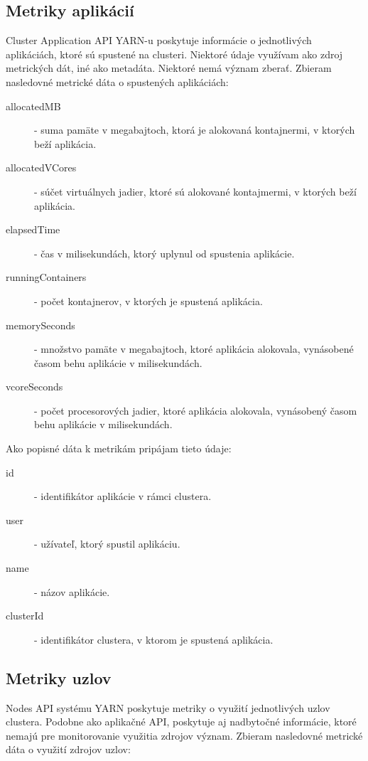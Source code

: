 \documentclass[12pt,twoside,color,cover,table]{fithesis3}
\begin{document}
\subsection{Metriky aplikácií}
Cluster Application API YARN-u poskytuje informácie o jednotlivých aplikáciách, ktoré sú spustené na clusteri. Niektoré údaje využívam ako zdroj metrických dát, iné ako metadáta. Niektoré nemá význam zberať.
Zbieram nasledovné metrické dáta o spustených aplikáciách:
\begin{description}
\item[allocatedMB] - suma pamäte v megabajtoch, ktorá je alokovaná kontajnermi, v ktorých beží aplikácia.
\item[allocatedVCores] - súčet virtuálnych jadier, ktoré sú alokované kontajmermi, v ktorých beží aplikácia.
\item[elapsedTime] - čas v milisekundách, ktorý uplynul od spustenia aplikácie.
\item[runningContainers] - počet kontajnerov, v ktorých je spustená aplikácia.
\item[memorySeconds] - množstvo pamäte v megabajtoch, ktoré aplikácia alokovala, vynásobené časom behu aplikácie v milisekundách.
\item[vcoreSeconds] - počet procesorových jadier, ktoré aplikácia alokovala, vynásobený časom behu aplikácie v milisekundách.
\end{description}

Ako popisné dáta k metrikám pripájam tieto údaje:
\begin{description}
\item[id] - identifikátor aplikácie v rámci clustera.
\item[user] - užívateľ, ktorý spustil aplikáciu.
\item[name] - názov aplikácie.
\item[clusterId] - identifikátor clustera, v ktorom je spustená aplikácia.
\end{description}

\subsection{Metriky uzlov}
Nodes API systému YARN poskytuje metriky o využití jednotlivých uzlov clustera. Podobne ako aplikačné API, poskytuje aj nadbytočné informácie, ktoré nemajú pre monitorovanie využitia zdrojov význam.
Zbieram nasledovné metrické dáta o využití zdrojov uzlov:
\end{document}
